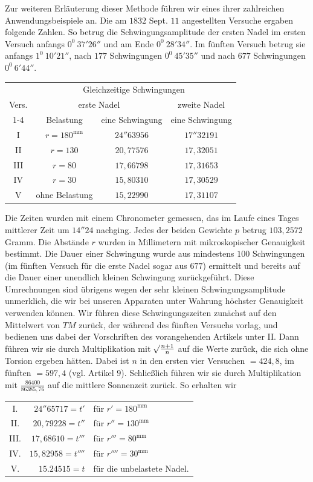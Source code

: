 Zur weiteren Erläuterung dieser Methode führen wir eines ihrer zahlreichen Anwendungsbeispiele an. Die am $1832$ Sept. $11$ angestellten Versuche ergaben folgende Zahlen.
\expandafter\def\csname HistoricalNoteText10\endcsname{So betrug die Schwingungsamplitude der ersten Nadel im ersten Versuch anfangs $0^0\ 37'26''$ und am Ende $0^0\ 28'34''$. Im fünften Versuch betrug sie anfangs $1^0\ 10'21''$, nach $177$ Schwingungen $0^0\ 45'35''$ und nach $677$ Schwingungen $0^0\ 6'44''$.}
\begin{center}
\begin{tabular}{c||c|c||c}
&\multicolumn{3}{c}{Gleichzeitige Schwingungen}\\
Vers.&\multicolumn{2}{c||}{erste Nadel}&zweite Nadel\\\cline{1-4}
&Belastung&eine Schwingung&eine Schwingung\\
I&$r=180^{\mathrm{mm}}$&$24''63956$&$17''32191$\\
II&$r=130$&$20{,}77576$&$17{,}32051$\\
III&$r=80$&$17{,}66798$&$17{,}31653$\\
IV&$r=30$&$15{,}80310$&$17{,}30529$\\
V&ohne Belastung&$15{,}22990$&$17{,}31107$
\end{tabular}
\end{center}

Die Zeiten wurden mit einem Chronometer gemessen, das im Laufe eines Tages mittlerer Zeit um $14''24$ nachging. Jedes der beiden Gewichte $p$ betrug $103{,}2572$ Gramm. Die Abstände $r$ wurden in Millimetern mit mikroskopischer Genauigkeit bestimmt. Die Dauer einer Schwingung wurde aus mindestens $100$ Schwingungen (im fünften Versuch für die erste Nadel sogar aus $677$) ermittelt und bereits auf die Dauer einer unendlich kleinen Schwingung zurückgeführt. Diese Umrechnungen sind übrigens wegen der sehr kleinen Schwingungsamplitude unmerklich, die wir bei unseren Apparaten unter Wahrung höchster Genauigkeit verwenden können. Wir führen diese Schwingungszeiten zunächst auf den Mittelwert von $TM$ zurück, der während des fünften Versuchs vorlag, und bedienen uns dabei der Vorschriften des vorangehenden Artikels unter II. Dann führen wir sie durch Multiplikation mit $\mathord{{}^{}\!\surd}\frac{n+1}{n}$ auf die Werte zurück, die sich ohne Torsion ergeben hätten. Dabei ist $n$ in den ersten vier Versuchen $=424{,}8$, im fünften $=597{,}4$ (vgl. Artikel $9$). Schließlich führen wir sie durch Multiplikation mit $\frac{86400}{86385{,}76}$ auf die mittlere Sonnenzeit zurück. So erhalten wir
\begin{center}
\begin{tabular}{crl}
I.&$24''65717=t'$&für $r'=180^{\mathrm{mm}}$\\
II.&$20{,}79228=t''$&für $r''=130^{\mathrm{mm}}$\\
III.&$17{,}68610=t'''$&für $r'''=80^{\mathrm{mm}}$\\
IV.&$15{,}82958=t''''$&für $r''''=30^{\mathrm{mm}}$\\
V.&$15.24515=t$&für die unbelastete Nadel.
\end{tabular}
\end{center}


